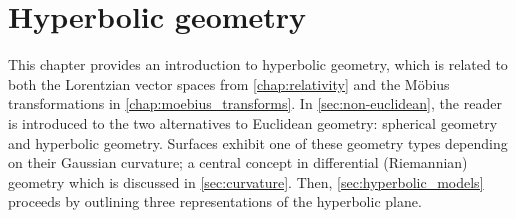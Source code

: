 \chapter{Hyperbolic geometry}
\label{chap:hyperbolic_geometry}
This chapter provides an introduction to hyperbolic geometry, which is related to both the Lorentzian vector spaces from \cref{chap:relativity} and the Möbius transformations in \cref{chap:moebius_transforms}. In \cref{sec:non-euclidean}, the reader is introduced to the two alternatives to Euclidean geometry: spherical geometry and hyperbolic geometry. Surfaces exhibit one of these geometry types depending on their Gaussian curvature; a central concept in differential (Riemannian) geometry which is discussed in \cref{sec:curvature}. Then, \cref{sec:hyperbolic_models} proceeds by outlining three representations of the hyperbolic plane.

